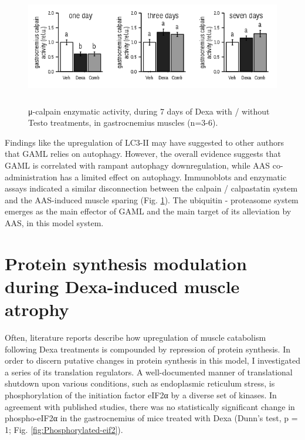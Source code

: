 \documentclass[12pt,english]{report}\usepackage[]{graphicx}\usepackage[]{color}
\newenvironment{knitrout}{}{} %
\begin{document}
\begin{figure}
\begin{knitrout}
\color{fgcolor}
\includegraphics[width=6in,height=2in]{figure/calpainactivity-1} 

\end{knitrout}

\protect\caption[Calpain enzymatic activity during Dexa with / without Testo treatments.]{μ-calpain enzymatic activity, during 7 days of Dexa with / without
Testo treatments, in gastrocnemius muscles (n=3-6).\label{fig:Calpain-enzymatic}}


\end{figure}


Findings like the upregulation of LC3-II may have suggested to other
authors that GAML relies on autophagy. However, the overall evidence
suggests that GAML is correlated with rampant autophagy downregulation,
while AAS co-administration has a limited effect on autophagy. Immunoblots
and enzymatic assays indicated a similar disconnection between the
calpain / calpastatin system and the AAS-induced muscle sparing (Fig.
\ref{fig:Calpain-enzymatic}). The ubiquitin - proteasome system emerges
as the main effector of GAML and the main target of its alleviation
by AAS, in this model system.


\section{Protein synthesis modulation during Dexa-induced muscle atrophy}

Often, literature reports describe how upregulation of muscle catabolism
following Dexa treatments is compounded by repression of protein synthesis.
In order to discern putative changes in protein synthesis in this
model, I investigated a series of its translation regulators. A well-documented
manner of translational shutdown upon various conditions, such as
endoplasmic reticulum stress, is phosphorylation of the initiation
factor eIF2α by a diverse set of kinases. In agreement with published
studies, there was no statistically significant change in phospho-eIF2α
in the gastrocnemius of mice treated with Dexa (Dunn's test, p = 1;
Fig. \ref{fig:Phosphorylated-eif2}). 
\end{document}
